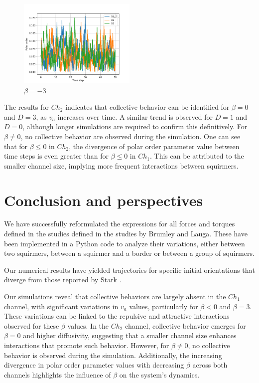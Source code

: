 \documentclass{article}
\begin{document}
\begin{figure}[H]
    \centering
    \includegraphics[width=0.5\textwidth]{videos/simulations/sim_D/betam3/dens_0_59/combined_polars.png}
    \caption{\footnotesize $\beta = -3$}
\end{figure}
The results for $Ch_2$ indicates that collective behavior can be identified for $\beta = 0$ and $D = 3$, as
$v_a$ increases over time. 
A similar trend is observed for $D = 1$ and $D = 0$, although longer simulations are required to
confirm this definitively. For $\beta \neq 0$, no collective behavior are observed during the simulation. One can see that 
for $\beta \leq 0$ in $Ch_2$, the divergence of polar order parameter value between time steps is even greater
than for $\beta \leq 0$ in $Ch_1$. This can be attributed to the smaller channel size, implying more frequent interactions 
between squirmers.\\

\section{Conclusion and perspectives}
We have successfully reformulated the expressions for all forces and torques defined in the studies defined in the studies by
Brumley\cite{Brumley} and Lauga\cite{Lauga}. 
These have been implemented in a Python code to analyze their variations, either between two squirmers, between a 
squirmer and a border or between a group of squirmers.
 
Our numerical results have yielded trajectories for specific initial orientations that diverge from those reported 
by Stark \cite{Stark}.

Our simulations reveal that collective behaviors are largely absent in the $Ch_1$
channel, with significant variations in $v_a$ values, particularly for $\beta <0$ and $\beta = 3$. 
These variations can be linked to the repulsive 
and attractive interactions observed for these $\beta$ values. 
In the $Ch_2$ channel, collective behavior emerges for $\beta = 0$ and higher diffusivity, 
suggesting that a smaller channel size enhances 
interactions that promote such behavior. However, for $\beta \neq 0$, no collective behavior is observed during the simulation. 
Additionally, the increasing divergence in polar order parameter values with decreasing $\beta$ 
across both channels highlights the influence of $\beta$ on the system's dynamics.
\end{document}
